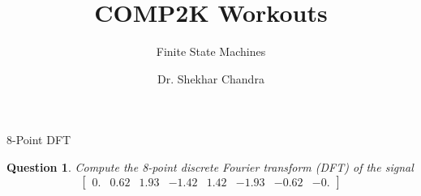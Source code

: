 \documentclass[pdf,aspectratio=169]{beamer}
\title{COMP2K Workouts}
\subtitle{Finite State Machines}
\author{Dr. Shekhar Chandra}
\newtheorem{thm}{Question}
\begin{document}
\begin{frame}
	\titlepage
\end{frame}

\begin{frame}{8-Point DFT}
\begin{thm}
	Compute the 8-point discrete Fourier transform (DFT) of the signal
	\begin{equation}
		\begin{bmatrix}
		0. &   0.62 & 1.93 & -1.42 &  1.42 & -1.93 & -0.62 & -0.
		\end{bmatrix}
	\end{equation}
\end{thm}
\end{frame}
\end{document}
